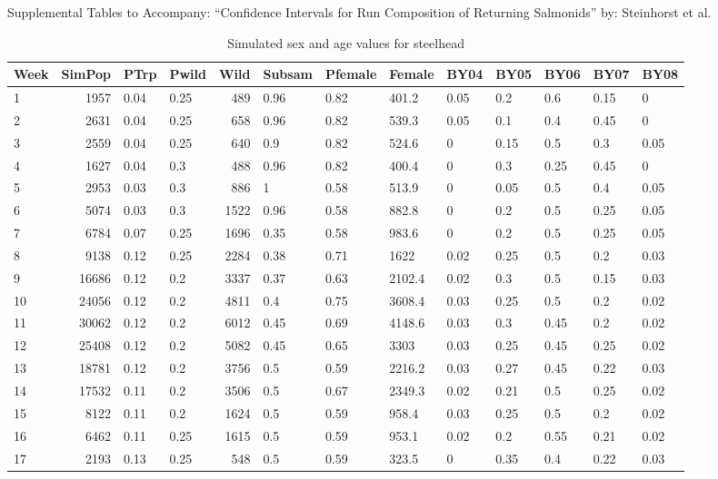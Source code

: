 \documentclass[12pt]{article}
\begin{document}
\begin{center}
\LARGE 
Supplemental Tables to Accompany:\linebreak
``Confidence Intervals for Run Composition\linebreak
of Returning Salmonids''\linebreak
by: Steinhorst et al.
\end{center}


\begin{table}[H]
\caption{Simulated sex and age values for steelhead}
\label{table:SHsim}
\begin{tabular}{ | l | r | l | l | r | l | l | l | l |l | l | l | l | }
\hline
Week&SimPop&PTrp&Pwild&Wild&Subsam&Pfemale&Female&BY04&BY05&BY06&BY07&BY08 \\ \hline
1&1957&0.04&0.25&489&0.96&0.82&401.2&0.05&0.2&0.6&0.15&0 \\ \hline
2&2631&0.04&0.25&658&0.96&0.82&539.3&0.05&0.1&0.4&0.45&0 \\ \hline
3&2559&0.04&0.25&640&0.9&0.82&524.6&0&0.15&0.5&0.3&0.05 \\ \hline
4&1627&0.04&0.3&488&0.96&0.82&400.4&0&0.3&0.25&0.45&0 \\ \hline
5&2953&0.03&0.3&886&1&0.58&513.9&0&0.05&0.5&0.4&0.05 \\ \hline
6&5074&0.03&0.3&1522&0.96&0.58&882.8&0&0.2&0.5&0.25&0.05 \\ \hline
7&6784&0.07&0.25&1696&0.35&0.58&983.6&0&0.2&0.5&0.25&0.05 \\ \hline
8&9138&0.12&0.25&2284&0.38&0.71&1622&0.02&0.25&0.5&0.2&0.03 \\ \hline
9&16686&0.12&0.2&3337&0.37&0.63&2102.4&0.02&0.3&0.5&0.15&0.03 \\ \hline
10&24056&0.12&0.2&4811&0.4&0.75&3608.4&0.03&0.25&0.5&0.2&0.02 \\ \hline
11&30062&0.12&0.2&6012&0.45&0.69&4148.6&0.03&0.3&0.45&0.2&0.02 \\ \hline
12&25408&0.12&0.2&5082&0.45&0.65&3303&0.03&0.25&0.45&0.25&0.02 \\ \hline
13&18781&0.12&0.2&3756&0.5&0.59&2216.2&0.03&0.27&0.45&0.22&0.03 \\ \hline
14&17532&0.11&0.2&3506&0.5&0.67&2349.3&0.02&0.21&0.5&0.25&0.02 \\ \hline
15&8122&0.11&0.2&1624&0.5&0.59&958.4&0.03&0.25&0.5&0.2&0.02 \\ \hline
16&6462&0.11&0.25&1615&0.5&0.59&953.1&0.02&0.2&0.55&0.21&0.02 \\ \hline
17&2193&0.13&0.25&548&0.5&0.59&323.5&0&0.35&0.4&0.22&0.03 \\ \hline

\end{tabular}
\end{table}
\end{document}
